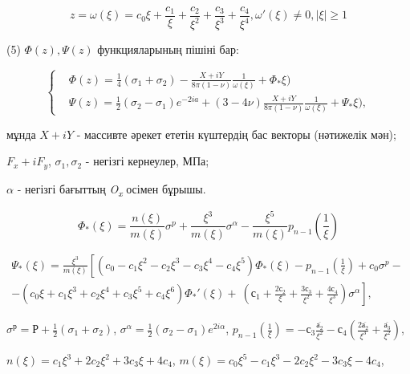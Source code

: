 \begin{equation}
z = \omega(\xi) = c_{0}\xi + \frac{c_{1}}{\xi} + \frac{c_{2}}{\xi^{2}} + \frac{c_{3}}{\xi^{3}} + \frac{c_{4}}{\xi^{4}},\omega'(\xi) \neq 0,|\xi| \geq 1
\end{equation}

(5) \(\Phi(z),\Psi(z)\) функцияларының пішіні бар:

\begin{equation}
\left\{ \begin{aligned}
 & \Phi(z) = \frac{1}{4}(\sigma_{1} + \sigma_{2}) - \frac{X + iY}{8\pi(1 - \nu)}\frac{1}{\omega(\xi)} + \Phi_{*}\xi) \\
 & \Psi(z) = \frac{1}{2}(\sigma_{2} - \sigma_{1})e^{- 2ia} + (3 - 4\nu)\frac{X + iY}{8\pi(1 - \nu)}\frac{1}{\omega(\xi)} + \Psi_{*}\xi),
\end{aligned} \right.
\end{equation}

мұнда \(X + iY\) - массивте әрекет ететін күштердің бас векторы
(нәтижелік мән);

\(F_{x} + iF_{y}\), \(\sigma_{1},\sigma_{2}\) - негізгі кернеулер, МПа;

\(\alpha\) - негізгі бағыттың \emph{O\textsubscript{x}} осімен бұрышы.

\[\Phi_{*}(\xi) = \frac{n(\xi)}{m(\xi)}\sigma^{p} + \frac{\xi^{3}}{m(\xi)}\sigma^{\alpha} - \frac{\xi^{5}}{m(\xi)}p_{n - 1}\left( \frac{1}{\xi} \right)\]

\begin{align*}
{\Psi_{*}(\xi) = \frac{\xi^{3}}{m(\xi)}\left\lbrack (c_{0} - c_{1}\xi^{2} - c_{2}\xi^{3} - c_{3}\xi^{4} - c_{4}\xi^{5})\Phi_{*}(\xi) - p_{n - 1}\left( \frac{1}{\xi} \right) + c_{0}\sigma^{p} - \right.\
}\\{- (c_{0}\xi + c_{1}\xi^{3} + c_{2}\xi^{4} + c_{3}\xi^{5} + c_{4}\xi^{6})\Phi_{*}'(\xi) + \left. \ \left( с_{1} + \frac{2с_{2}}{\xi} + \frac{3с_{3}}{\xi^{2}} + \frac{4с_{4}}{\xi^{3}} \right)\sigma^{\alpha} \right\rbrack,}
\end{align*}

\(\sigma^{р} = Р + \frac{1}{2}(\sigma_{1} + \sigma_{2})\),
\(\sigma^{\alpha} = \frac{1}{2}(\sigma_{2} - \sigma_{1})e^{2i\alpha}\),
\(p_{n - 1}\left( \frac{1}{\xi} \right) = - с_{3}\frac{\overline{а_{2}}}{\xi^{2}} - с_{4}\left( \frac{2\overline{а_{2}}}{\xi^{3}} + \frac{\overline{а_{3}}}{\xi^{2}} \right)\),

\(n(\xi) = c_{1}\xi^{3} + 2c_{2}\xi^{2} + 3c_{3}\xi + 4c_{4}\),
\(m(\xi) = c_{0}\xi^{5} - c_{1}\xi^{3} - 2c_{2}\xi^{2} - 3c_{3}\xi - 4c_{4}\),

